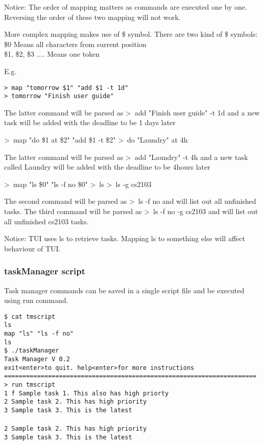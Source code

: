 \documentclass[12pt, a4paper]{article}
\begin{document}
Notice: The order of mapping matters as commands are executed one by one. Reversing the order of these two mapping will not work.

More complex mapping makes use of \$ symbol. There are two kind of \$ symbols:
    \$0 Means all characters from surrent position\\
    \$1, \$2, \$3 .... Means one token

E.g.
    
\texttt{\textgreater \ map "tomorrow \$1" "add \$1 -t 1d"\\
  \textgreater \ tomorrow "Finish user guide"}
    
    The latter command will be parsed as
    \textgreater \ add "Finish user guide" -t 1d
    and a new task will be added with the deadline to be 1 days later

    \textgreater \ map "do \$1 at \$2" "add \$1 -t \$2"
    \textgreater \ do "Laundry" at 4h
    
    The latter command will be parsed as
    \textgreater \ add "Laundry" -t 4h
    and a new task called Laundry will be added with the deadline to be 4hours later

    \textgreater \ map "ls \$0" "ls -f no \$0"
    \textgreater \ ls
    \textgreater \ ls -g cs2103
    
    The second command will be parsed as
    \textgreater \ ls -f no 
    and will list out all unfinished tasks.
    The third command will be parsed as
    \textgreater \ ls -f no -g cs2103
    and will list out all unfinished cs2103 tasks.

Notice: TUI uses ls to retrieve tasks. Mapping ls to something else will affect behaviour of TUI.
    
\subsubsection{taskManager script}

Task manager commands can be saved in a single script file and be executed using run command.

\noindent \texttt{\$ cat tmscript\\
  ls\\
  map "ls" "ls -f no"\\
  ls\\
  \$ ./taskManager\\
  Task Manager V 0.2\\
  exit\textless enter\textgreater to quit. help\textless enter\textgreater for more instructions\\
  =====================================================================\\
  \textgreater \ run tmscript\\
  1 f Sample task 1. This also has high priorty\\
  2   Sample task 2. This has high priority\\
  3   Sample task 3. This is the latest\\
  \\2   Sample task 2. This has high priority\\
  3   Sample task 3. This is the latest}
\end{document}
